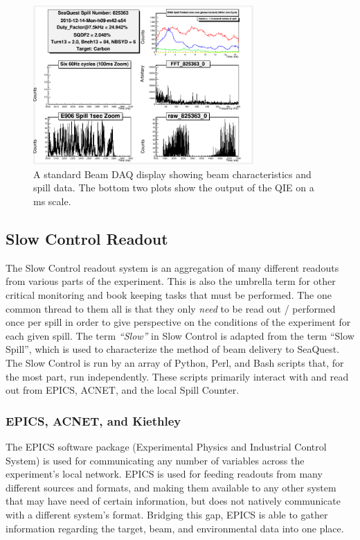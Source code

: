\begin{figure}
	\centering
	\includegraphics[width=0.75\textwidth]{figures/E906FFT-scalerDAQ.png}
	\caption{A standard Beam DAQ display showing beam characteristics and spill data. The bottom two plots show the output of the QIE on a \unit[]{ms} scale.}
	\label{fig:beamdaq}
\end{figure}

\subsection{Slow Control Readout}

The Slow Control readout system is an aggregation of many different readouts from various parts of the experiment. This is also the umbrella term for other critical monitoring and book keeping tasks that must be performed. The one common thread to them all is that they only \emph{need} to be read out / performed once per spill in order to give perspective on the conditions of the experiment for each given spill. The term \emph{``Slow''} in Slow Control is adapted from the term ``Slow Spill'', which is used to characterize the method of beam delivery to SeaQuest. The Slow Control is run by an array of Python, Perl, and Bash scripts that, for the most part, run independently. These scripts primarily interact with and read out from EPICS, ACNET, and the local Spill Counter.

\subsubsection{EPICS, ACNET, and Kiethley}

The EPICS software package (Experimental Physics and Industrial Control System) is used for communicating any number of variables across the experiment's local network. EPICS is used for feeding readouts from many different sources and formats, and making them available to any other system that may have need of certain information, but does not natively communicate with a different system's format. Bridging this gap, EPICS is able to gather information regarding the target, beam, and environmental data into one place.

